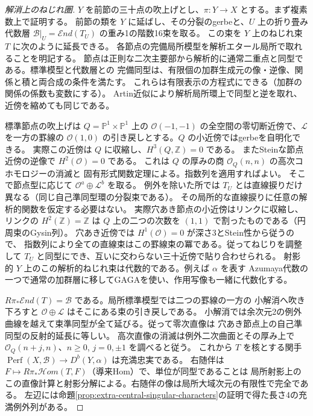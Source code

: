 \begin{proof}[解消上のねじれ圏]
$Y$ を前節の三十点の吹上げとし、$\pi:Y\to X$ とする。まず複素数上で証明する。
前節の類を $Y$ に延ばし、その分裂のgerbeと、$U$ 上の折り畳み代数層
$\mathcal B|_U=\mathcal End(T_U)$ の重み1の階数16束を取る。
この束を $Y$ 上のねじれ束 $T$ に次のように延長できる。
各節点の完備局所模型を解析エタール局所で取れることを明記する。
節点は正則な二次主要部から解析的に通常二重点と同型である。標準模型と代数層との
完備同型は、有限個の加群生成元の像・逆像、関係と積と両合成の条件を満たす。
これらは有限表示の方程式にできる（加群の関係の係数も変数にする）。
Artin近似により解析局所環上で同型と逆を取れ、近傍を縮めても同じである。

標準節点の吹上げは $Q=\mathbb P^1\times\mathbb P^1$ 上の
$\mathcal O(-1,-1)$ の全空間の零切断近傍で、$\mathcal L$ を一方の罫線の
$\mathcal O(1,0)$ の引き戻しとする。$Q$ の小近傍ではgerbeを自明化できる。
実際この近傍は $Q$ に収縮し、$H^3(Q,\mathbb Z)=0$ である。
またSteinな節点近傍の逆像で $H^2(\mathcal O)=0$ である。
これは $Q$ の厚みの商 $\mathcal O_Q(n,n)$ の高次コホモロジーの消滅と
固有形式関数定理による。指数列を適用すればよい。
そこで節点型に応じて $\mathcal O^a\oplus\mathcal L^b$ を取る。
例外を除いた所では $T_U$ とは直線捩りだけ異なる（同じ自己準同型環の分裂束である）。
その局所的な直線捩りに任意の解析的関数を仮定する必要はない。
実際穴あき節点の小近傍はリンクに収縮し、リンクの $H^2(\mathbb Z)=\mathbb Z$ は
$Q$ 上の二つの次数を $(1,1)$ で割ったものである（円周束のGysin列）。
穴あき近傍では $H^1(\mathcal O)=0$ が深さ3とStein性から従うので、
指数列により全ての直線束はこの罫線束の冪である。従ってねじりを調整して
$T_U$ と同型にでき、互いに交わらない三十近傍で貼り合わせられる。
射影的 $Y$ 上のこの解析的ねじれ束は代数的である。例えば $\alpha$ を表す
Azumaya代数の一つで通常の加群層に移してGAGAを使い、作用写像も一緒に代数化する。

$R\pi_*\mathcal End(T)=\mathcal B$ である。局所標準模型では二つの罫線の一方の
小解消へ吹き下ろすと $\mathcal O\oplus\mathcal L$ はそこにある束の引き戻しである。
小解消では余次元2の例外曲線を越えて束準同型が全て延びる。従って零次直像は
穴あき節点上の自己準同型の反射的延長に等しい。
高次直像の消滅は例外二次曲面とその厚み上で
$\mathcal O_Q(n+j,n)$、$n\ge0$, $j=0,\pm1$ を調べると従う。
これから $T$ を核とする関手
$\operatorname{Perf}(X,\mathcal B)\to D^b(Y,\alpha)$ は充満忠実である。
右随伴は $F\mapsto R\pi_*\mathcal Hom(T,F)$（導来Hom）で、単位が同型であることは
局所射影上のこの直像計算と射影分解による。右随伴の像は局所大域次元の有限性で完全である。
左辺には命題\ref{prop:extra-central-singular-characters}の証明で得た長さ4の充満例外列がある。


\end{proof}
